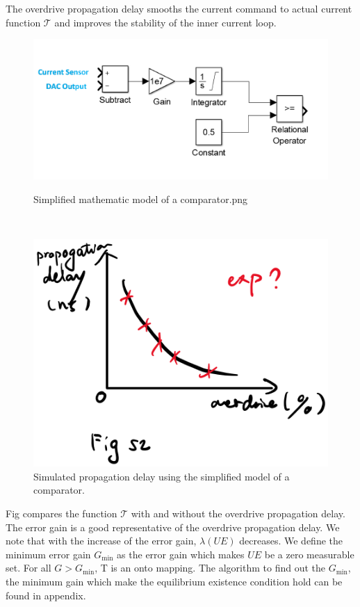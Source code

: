 The overdrive propagation delay smooths the current command to actual current function $\mathcal{T}$ and improves the stability of the inner current loop.

\begin{figure}
\begin{minipage}{0.32\textwidth}
    \centering
    \includegraphics[width=\textwidth]{Figure/section3/copd/mathmodelcomp}
    \caption{ \label{fig:copd1}Simplified mathematic model of a comparator.png}
\end{minipage}
~
\begin{minipage}{0.32\textwidth}
    \centering
    \includegraphics[width=\textwidth]{Figure/section3/copd/simumodelcomp}
  \caption{\label{fig:copd2}Simulated propagation delay using the simplified model of a comparator.}
\end{minipage}
\end{figure}

Fig compares the function $\mathcal{T}$ with and without the overdrive propagation delay. The error gain is a good representative of the overdrive propagation delay. We note that with the increase of the error gain, $\lambda(U\!E)$ decreases. We define the minimum error gain $G_{\text{min}}$ as the error gain which makes $U\!E$ be a zero measurable set. For all $G > G_{\text{min}}$, T is an onto mapping. The algorithm to find out the $G_{\text{min}}$, the minimum gain which make the equilibrium existence condition hold can be found in appendix.

